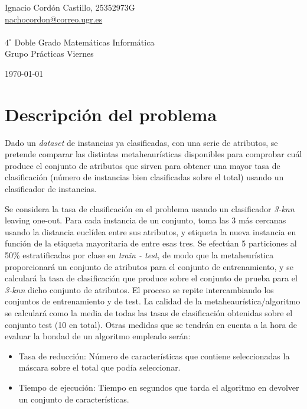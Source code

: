 \documentclass[a4paper,11pt]{article}
\newcommand{\imagent}[4]{
  \begin{wrapfigure}{#4}{0.7\textwidth}
    \begin{center}
    \texttt{[image: \#1]}
    \end{center}
    \caption{#3}
    \label{#4}
  \end{wrapfigure}
}
\newcommand{\imagen}[4]{
  \begin{minipage}{\linewidth}
    \centering
    \texttt{[image: \#1]}
    \captionof{figure}{#2}
    \label{#3}
  \end{minipage} 
}
\begin{document}
\begin{titlepage}
\begin{minipage}{\textwidth}
\begin{center} \large
Ignacio Cordón Castillo, 25352973G\\
\url{nachocordon@correo.ugr.es}\\
\ \\
$4^{\circ}$ Doble Grado Matemáticas Informática\\
Grupo Prácticas Viernes
\end{center}
\end{minipage}


\vspace{\fill}%
\large\today
\end{titlepage}  

\newpage
\tableofcontents
\newpage

\section{Descripción del problema}
Dado un \textit{dataset} de instancias ya clasificadas, con una serie de atributos, se pretende comparar las distintas 
metaheaurísticas disponibles para comprobar cuál produce el conjunto de atributos que sirven para obtener una mayor 
tasa de clasificación (número de instancias bien clasificadas sobre el total) usando un clasificador de instancias.

Se considera la tasa de clasificación en el problema usando un clasificador \textit{3-knn} leaving one-out. Para cada 
instancia de un conjunto, toma las 3 más cercanas usando la distancia euclídea entre sus atributos, y etiqueta la nueva
instancia en función de la etiqueta mayoritaria de entre esas tres. Se efectúan 5 particiones al 50\% estratificadas
por clase en \textit{train - test}, de modo que la metaheurística proporcionará un conjunto de atributos para el conjunto de
entrenamiento, y se calculará la tasa de clasificación que produce sobre el conjunto de prueba para el \textit{3-knn} dicho
conjunto de atributos. El proceso se repite intercambiando los conjuntos de entrenamiento y de test. La calidad de la 
metaheaurística/algoritmo se calculará como la media de todas las tasas de clasificación obtenidas sobre el conjunto test
(10 en total). Otras medidas que se tendrán en cuenta a la hora de evaluar la bondad de un algoritmo empleado serán:
\begin{itemize}
 \item Tasa de reducción: Número de características que contiene seleccionadas la máscara sobre el total que podía 
 seleccionar. 
 \item Tiempo de ejecución: Tiempo en segundos que tarda el algoritmo en devolver un conjunto de características.
\end{itemize}
\end{document}
